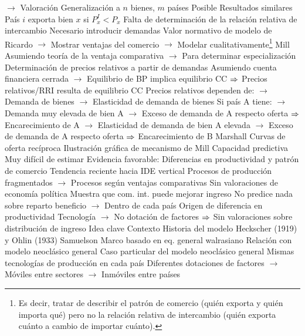 \documentclass{nuevotema}
\begin{document}
\begin{esquemal}
				\4[] $\to$ 
		\2 Valoración
			\3 Generalización a $n$ bienes, $m$ países
				\4 Posible
				\4 Resultados similares
				\4 País $i$ exporta bien $x$ si $P_x^I < P_x$
			\3 Falta de determinación de la relación relativa de intercambio
				\4 Necesario introducir demandas
				\4 Valor normativo de modelo de Ricardo
				\4[] $\to$ Mostrar ventajas del comercio
				\4[] $\to$ Modelar cualitativamente\footnote{Es decir, tratar de describir el patrón de comercio (quién exporta y quién importa qué) pero no la relación relativa de intercambio (quién exporta cuánto a cambio de importar cuánto).}
				\4 Mill
				\4[] Asumiendo teoría de la ventaja comparativa
				\4[] $\to$ Para determinar especialización
				\4[] Determinación de precios relativos a partir de demandas
				\4[] Asumiendo cuenta financiera cerrada
				\4[] $\to$ Equilibrio de BP implica equilibrio CC
				\4[] $\Rightarrow$ Precios relativos/RRI resulta de equilibrio CC
				\4[] Precios relativos dependen de:
				\4[] $\to$ Demanda de bienes
				\4[] $\to$ Elasticidad de demanda de bienes
				\4[] Si país A tiene:
				\4[] $\to$ Demanda muy elevada de bien A
				\4[] $\to$ Exceso de demanda de A respecto oferta
				\4[] $\Rightarrow$ Encarecimiento de A
				\4[] $\to$ Elasticidad de demanda de bien A elevada
				\4[] $\to$ Exceso de demanda de A respecto oferta
				\4[] $\Rightarrow$ Encarecimiento de B
				\4 Marshall
				\4[] Curvas de oferta recíproca
				\4[] Ilustración gráfica de mecanismo de Mill
			\3 Capacidad predictiva
				\4 Muy difícil de estimar
				\4 Evidencia favorable:
				\4[] Diferencias en productividad y patrón de comercio
				\4 Tendencia reciente hacia IDE vertical
				\4[] Procesos de producción fragmentados
				\4[] $\to$ Procesos según ventajas comparativas
			\3 Sin valoraciones de economía política
				\4 Muestra que com. int. puede mejorar ingreso
				\4 No predice nada sobre reparto beneficio
				\4[] $\to$ Dentro de cada país
				\4 Origen de diferencia en productividad
				\4[] Tecnología
				\4[] $\to$ No dotación de factores
				\4[] $\Rightarrow$ Sin valoraciones sobre distribución de ingreso
	\1 
		\2 Idea clave
			\3 Contexto
				\4 Historia del modelo
				\4[] Heckscher (1919) y Ohlin (1933)
				\4[] Samuelson
				\4[] Marco basado en eq. general walrasiano
				\4 Relación con modelo neoclásico general
				\4[] Caso particular del modelo neoclásico general
				\4[] Mismas tecnologías de producción en cada país
				\4[] Diferentes dotaciones de factores
				\4[] $\to$ Móviles entre sectores
				\4[] $\to$ Inmóviles entre países

\end{esquemal}
\end{document}
